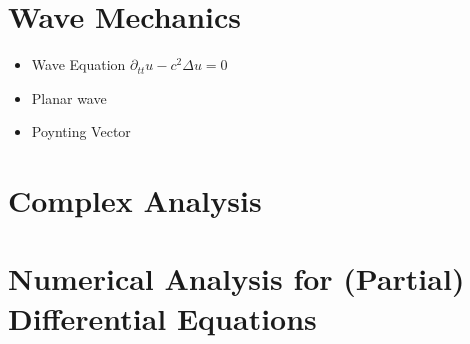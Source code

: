 \documentclass[10pt]{article}
\begin{document}
\section{Wave Mechanics}
\begin{itemize}
	\item Wave Equation $\partial_{tt} u-c^2\Delta u=0$
	\item Planar wave
	\item Poynting Vector
\end{itemize}

\section{Complex Analysis}

\section{Numerical Analysis for (Partial) Differential Equations}
\end{document}

